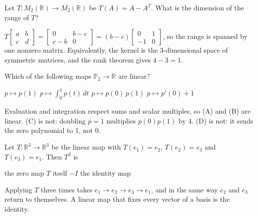 \begin{question}[id=lt-17, marks=2]
Let $T : M_2(\mathbb{R}) \to M_2(\mathbb{R})$ be $T(A) = A - A^T$. What is the dimension of the range of $T$?
\begin{solution}
$T\begin{bmatrix} a & b \\ c & d \end{bmatrix} = \begin{bmatrix} 0 & b - c \\ c - b & 0 \end{bmatrix} = (b - c)\begin{bmatrix} 0 & 1 \\ -1 & 0 \end{bmatrix}$, so the range is spanned by one nonzero matrix. Equivalently, the kernel is the 3-dimensional space of symmetric matrices, and the rank theorem gives $4 - 3 = 1$.
\end{solution}
\end{question}

\begin{question}[id=lt-18, type=msq, marks=2]
Which of the following maps $\mathbb{P}_2 \to \mathbb{R}$ are linear?
\begin{options}
  \correct $p \mapsto p(1)$
  \correct $p \mapsto \int_0^1 p(t)\,dt$
  \option $p \mapsto p(0)\,p(1)$
  \option $p \mapsto p'(0) + 1$
\end{options}
\begin{solution}
Evaluation and integration respect sums and scalar multiples, so (A) and (B) are linear. (C) is not: doubling $p = 1$ multiplies $p(0)p(1)$ by 4. (D) is not: it sends the zero polynomial to 1, not 0.
\end{solution}
\end{question}

\begin{question}[id=lt-19]
Let $T : \mathbb{R}^3 \to \mathbb{R}^3$ be the linear map with $T(e_1) = e_2$, $T(e_2) = e_3$ and $T(e_3) = e_1$. Then $T^3$ is
\begin{options}
  \option the zero map
  \option $T$ itself
  \option $-I$
  \correct the identity map
\end{options}
\begin{solution}
Applying $T$ three times takes $e_1 \to e_2 \to e_3 \to e_1$, and in the same way $e_2$ and $e_3$ return to themselves. A linear map that fixes every vector of a basis is the identity.
\end{solution}
\end{question}

